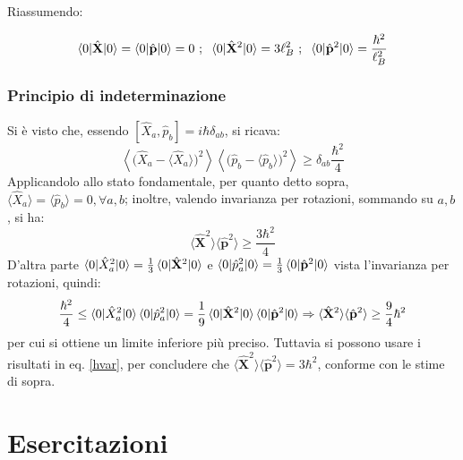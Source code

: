 \documentclass[10pt, a4paper]{scrartcl}
\numberwithin{equation}{subsection}
\theoremstyle{style2}
\theoremstyle{style1}
\newenvironment{boxenv}[1][]{
    \begin{eqbox}[#1]
    }{
   \end{eqbox}
}
\begin{document}
Riassumendo:
\begin{boxenv}[]
	\begin{equation}\label{hvar}
		\braket{0|\hat{\mathbf{X} }|0} = \braket{0|\hat{\mathbf{p} }|0} = 0\ ; \hspace{.2cm}\braket{0|\hat{\mathbf{X} }^2|0} = 3\ell _B^2 \ ; \hspace{.2cm} \braket{0|\hat{\mathbf{p} }^2|0} = \frac{\hbar ^2}{\ell _B^2}
\end{equation}
\end{boxenv}
\subsubsection{Principio di indeterminazione}
Si \`e visto che, essendo $[\hat{X}_a, \hat{p}_b] = i \hbar  \delta _{ab} $, si ricava:
\begin{equation}
	\left\langle \big(\hat{X}_a - \langle \hat{X}_a \rangle\big)^2 \right\rangle \left\langle \big(\hat{p}_b - \langle \hat{p}_b \rangle\big)^2 \right\rangle \ge \delta _{ab} \frac{\hbar ^2}{4}
\end{equation}
Applicandolo allo stato fondamentale, per quanto detto sopra, $\langle \hat{X}_a \rangle= \langle \hat{p}_b \rangle=0, \forall a,b$; inoltre, valendo invarianza per rotazioni, sommando su $a,b$, si ha:
\begin{equation}
	\langle \hat{\mathbf{X} }^2 \rangle \langle \hat{\mathbf{p} }^2 \rangle\ge \frac{3\hbar ^2}{4}
\end{equation}
D'altra parte $\braket{0|\hat{X}_a^2|0} = \frac{1}{3} \braket{0|\hat{\mathbf{X} }^2|0} $ e $\braket{0|\hat{p}_a^2|0} = \frac{1}{3} \braket{0|\hat{\mathbf{p} }^2|0} $ vista l'invarianza per rotazioni, quindi:
\begin{equation}
	\frac{\hbar^2}{4}\le \braket{0|\hat{X}_a^2|0} \braket{0|\hat{p}_a^2|0} = \frac{1}{9} \braket{0|\hat{\mathbf{X} }^2|0}  \braket{0|\hat{\mathbf{p} }^2|0} \Rightarrow \langle \hat{\mathbf{X} }^2 \rangle \langle \hat{\mathbf{p} }^2 \rangle \ge \frac{9}{4}\hbar ^2
\end{equation}
per cui si ottiene un limite inferiore pi\`u preciso. Tuttavia si possono usare i risultati in eq. \ref{hvar}, per concludere che $\langle \hat{\mathbf{X} }^2 \rangle\langle \hat{\mathbf{p} }^2 \rangle = 3\hbar ^2$, conforme con le stime di sopra.

\newpage
\section{Esercitazioni}
\end{document}
